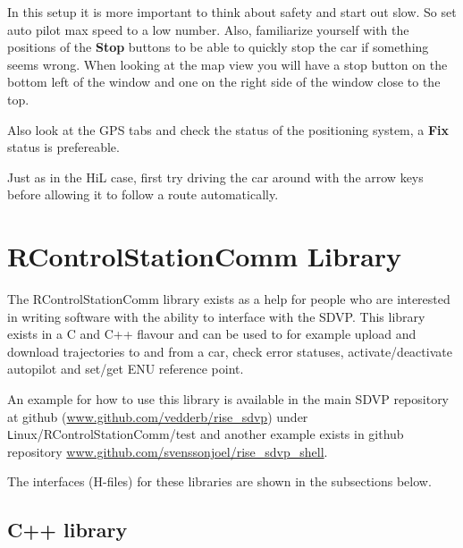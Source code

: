 \documentclass[12pt]{article} %
\begin{document}
In this setup it is more important to think about safety and start out
slow. So set auto pilot max speed to a low number. Also, familiarize
yourself with the positions of the {\bf Stop} buttons to be able to
quickly stop the car if something seems wrong. When looking at the map
view you will have a stop button on the bottom left of the window and
one on the right side of the window close to the top.

Also look at the GPS tabs and check the status of the positioning
system, a {\bf Fix} status is prefereable. 

Just as in the HiL case, first try driving the car around with the
arrow keys before allowing it to follow a route automatically.

\section{RControlStationComm Library}\label{sec:comm}

The RControlStationComm library exists as a help for people who are
interested in writing software with the ability to interface with the
SDVP. This library exists in a C and C++ flavour and can be used to
for example upload and download trajectories to and from a car, check
error statuses, activate/deactivate autopilot and set/get ENU
reference point.

An example for how to use this library is available in the main SDVP
repository at github (\url{www.github.com/vedderb/rise_sdvp}) under {\texttt Linux/RControlStationComm/test} and
another example exists in github repository
\url{www.github.com/svenssonjoel/rise_sdvp_shell}.

The interfaces (H-files) for these libraries are shown in the subsections below.

\subsection{C++ library}
\end{document}
